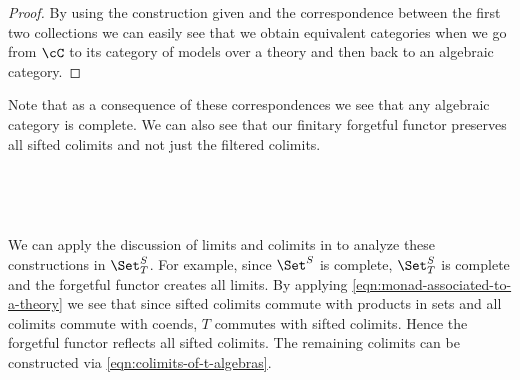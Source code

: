 \documentclass[leqno,oneside,english]{elsarticle}
\newcounter{enumisaved}
\newlength{\thmsaved}
\newlength{\thmnow}
\begin{document}
{{{\begin{proof}
  By using the construction given and the correspondence between the
  first two collections we can easily see that we obtain equivalent
  categories when we go from $\cC$ to its category of models over a
  theory and then back to an algebraic category.

  \end{proof}
  Note that as a consequence of these correspondences we see that any
  algebraic category is complete.
  We can also see that our finitary forgetful functor preserves all
  sifted colimits and not just the filtered colimits.

}
  {}
  \ 
  \ifthenelse{\lengthtest{\thmnow > \thmsaved}}{
    
    \setcounter{thm}{{\strip@pt{\thmsaved}}}  
  }{
    
  }
  \setcounter{enumi}{\theenumisaved}
    \else
  \fi
}}{}

{{    {}  \ifshowcomplete
  \ 
  {
\begin{rmk*}\label{rem:colimits-in-theories}
  We can apply the discussion of limits and colimits in
  to analyze these constructions in $\Set^{S}_T$.  For
example, since $\Set^{S}$ is complete, $\Set^{S}_T$ is complete and the
  forgetful functor creates all limits. By applying
\eqref{eqn:monad-associated-to-a-theory} we see that since sifted
 colimits commute with products in sets and all colimits commute with
 coends, $T$ commutes with sifted colimits. Hence the forgetful
 functor reflects all sifted colimits. The remaining colimits can be
 constructed via \eqref{eqn:colimits-of-t-algebras}.
\end{rmk*}

}
  {}
  \ 
  \ifthenelse{\lengthtest{\thmnow > \thmsaved}}{
    
    \setcounter{thm}{{\strip@pt{\thmsaved}}}  
  }{
    
  }
  \setcounter{enumi}{\theenumisaved}
    \else  \fi
}}{}
\end{document}
